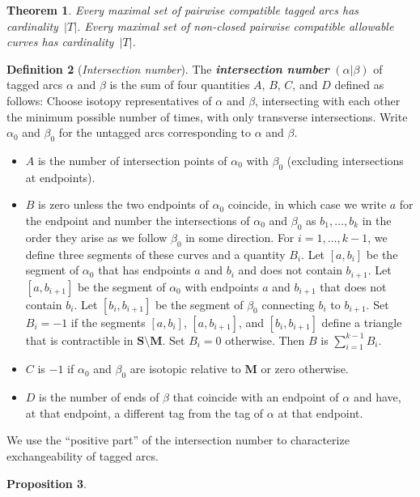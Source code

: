 \documentclass{amsart}
\newtheorem{proposition}{Proposition}[section]
\newtheorem{theorem}[proposition]{Theorem}
\theoremstyle{definition}
\newtheorem{definition}[proposition]{Definition}
\theoremstyle{remark}
\numberwithin{equation}{section}
\newcommand{\newword}[1]{\textbf{\emph{#1}}}
\newcommand{\0}{{\mathbf{0}}}
\newcommand{\M}{\mathbf{M}}
\renewcommand{\S}{\mathbf{S}}
\begin{document}
\begin{theorem}\label{card thm}
Every maximal set of pairwise compatible tagged arcs has cardinality~$|T|$.
Every maximal set of non-closed pairwise compatible allowable curves has cardinality~$|T|$.
\end{theorem}

\begin{definition}[\emph{Intersection number}]\label{int num def}
The \newword{intersection number} $(\alpha|\beta)$ of tagged arcs $\alpha$ and $\beta$ is the sum of four quantities $A$, $B$, $C$, and $D$ defined as follows:
Choose isotopy representatives of $\alpha$ and $\beta$, intersecting with each other the minimum possible number of times, with only transverse intersections.
Write $\alpha_0$ and $\beta_0$ for the untagged arcs corresponding to $\alpha$ and $\beta$.
\begin{itemize}
\item
$A$ is the number of intersection points of $\alpha_0$ with $\beta_0$ (excluding intersections at endpoints).
\item
$B$ is zero unless the two endpoints of $\alpha_0$ coincide, in which case we write $a$ for the endpoint and number the intersections of $\alpha_0$ and $\beta_0$ as $b_1,\ldots,b_k$ in the order they arise as we follow $\beta_0$ in some direction.
For $i=1,\ldots,k-1$, we define three segments of these curves and a quantity $B_i$.
Let $[a,b_i]$ be the segment of $\alpha_0$ that has endpoints $a$ and $b_i$ and does not contain $b_{i+1}$.
Let $[a,b_{i+1}]$ be the segment of $\alpha_0$ with endpoints $a$ and $b_{i+1}$ that does not contain $b_i$.
Let $[b_i,b_{i+1}]$ be the segment of $\beta_0$ connecting $b_i$ to $b_{i+1}$.
Set $B_i=-1$ if the segments $[a,b_i]$, $[a,b_{i+1}]$, and $[b_i,b_{i+1}]$ define a triangle that is contractible in $\S\setminus\M$.
Set $B_i=0$ otherwise.
Then $B$ is $\sum_{i=1}^{k-1}B_i$.
\item
$C$ is $-1$ if $\alpha_0$ and $\beta_0$ are isotopic relative to $\M$ or zero otherwise.
\item
$D$ is the number of ends of $\beta$ that coincide with an endpoint of $\alpha$ and have, at that endpoint, a different tag from the tag of $\alpha$ at that endpoint.
\end{itemize}
\end{definition}

We use the ``positive part'' of the intersection number to characterize exchangeability of tagged arcs.

\begin{proposition}\label{exch char}

\end{proposition}
\end{document}
